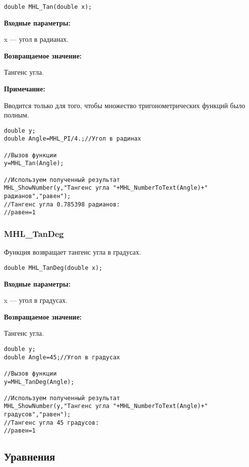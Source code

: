 \documentclass[a4paper,12pt]{article}
\begin{document}
\begin{lstlisting}[label=code_syntax_MHL_Tan,caption=Синтаксис]
double MHL_Tan(double x);
\end{lstlisting}

\textbf{Входные параметры:}

 x --- угол в радианах.

\textbf{Возвращаемое значение:}

Тангенс угла.

\textbf{Примечание:}

 Вводится только для того, чтобы множество тригонометрических функций было полным.


\begin{lstlisting}[label=code_use_MHL_Tan,caption=Пример использования]
double y;
double Angle=MHL_PI/4.;//Угол в радинах

//Вызов функции
y=MHL_Tan(Angle);

//Используем полученный результат
MHL_ShowNumber(y,"Тангенс угла "+MHL_NumberToText(Angle)+" радианов","равен");
//Тангенс угла 0.785398 радианов:
//равен=1
\end{lstlisting}

\subsubsection{MHL\_TanDeg}\label{MHL_TanDeg}

Функция возвращает тангенс угла в градусах.


\begin{lstlisting}[label=code_syntax_MHL_TanDeg,caption=Синтаксис]
double MHL_TanDeg(double x);
\end{lstlisting}

\textbf{Входные параметры:}

 x --- угол в градусах.

\textbf{Возвращаемое значение:}

Тангенс угла.


\begin{lstlisting}[label=code_use_MHL_TanDeg,caption=Пример использования]
double y;
double Angle=45;//Угол в градусах

//Вызов функции
y=MHL_TanDeg(Angle);

//Используем полученный результат
MHL_ShowNumber(y,"Тангенс угла "+MHL_NumberToText(Angle)+" градусов","равен");
//Тангенс угла 45 градусов:
//равен=1
\end{lstlisting}

\subsection{Уравнения}
\end{document}
